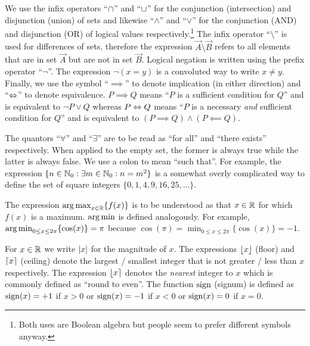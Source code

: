 We use the infix operators \enquote{\(\cap\)} and \enquote{\(\cup\)} for the conjunction (intersection)
and disjunction (union) of sets and likewise \enquote{\(\land\)} and \enquote{\(\lor\)} for the conjunction (AND) and
disjunction (OR) of logical values respectively.\footnote{%
  Both uses are Boolean algebra but people seem to prefer different symbols anyway.
}
The infix operator \enquote{\(\setminus\)} is used for differences of sets, therefore the expression
\(\Vec{A}\setminus\Vec{B}\) refers to all elements that are in set \(\Vec{A}\) but are not in set \(\Vec{B}\).  Logical
negation is written using the prefix operator \enquote{\(\lnot\)}.  The expression \(\lnot(x=y)\) is a convoluted way to
write \({x}\neq{y}\).  Finally, we use the symbol \enquote{\(\implies\)} to denote implication (in either direction) and
\enquote{\(\Leftrightarrow\)} to denote equivalence.  \({P}\implies{Q}\) means \enquote{\(P\) is a sufficient condition for
  \(Q\)} and is equivalent to \(\lnot{P}\lor{Q}\) whereas \({P}\Leftrightarrow{Q}\) means \enquote{\(P\) is a necessary
  \emph{and} sufficient condition for \(Q\)} and is equivalent to \(({P}\implies{Q})\land({P}\impliedby{Q})\).

The quantors \enquote{\(\forall\)} and \enquote{\(\exists\)} are to be read as \enquote{for all} and \enquote{there
  exists} respectively.  When applied to the empty set, the former is always true while the latter is always false.  We
use a colon to mean \enquote{such that}.  For example, the expression
\(\{n\in\mathbb{N}_0:\exists{}m\in\mathbb{N}_0:{}n=m^2\}\) is a somewhat overly complicated way to define the set
of square integers \(\{0,1,4,9,16,25,\ldots\}\).

The expression \(\argmax_{x\in\Reals}\{f(x)\}\) is to be understood as that \(x\in\Reals\) for which \(f(x)\) is a
maximum.  \(\operatorname*{arg\,min}\) is defined analogously.  For example, \(\operatorname*{arg\,min}_{0\leq{x}\leq2\pi}\{\cos(x)\}=\pi\) because
\(\cos(\pi)=\min_{0\leq{x}\leq2\pi}\{\cos(x)\}=-1\).

For \(x\in\Reals\) we write \(\left\lvert x\right\rvert\) for the magnitude of \(x\).  The expressions \(\left\lfloor x\right\rfloor\) (floor) and
\(\left\lceil x\right\rceil\) (ceiling) denote the largest / smallest integer that is not greater / less than \(x\) respectively.  The
expression \(\left\lfloor x\right\rceil\) denotes the \emph{nearest} integer to \(x\) which is commonly defined as \enquote{round to
  even}.  The function \(\operatorname{sign}\) (signum) is defined as \(\operatorname{sign}(x)=+1\) if \(x>0\) or
\(\operatorname{sign}(x)=-1\) if \(x<0\) or \(\operatorname{sign}(x)=0\) if \(x=0\).

